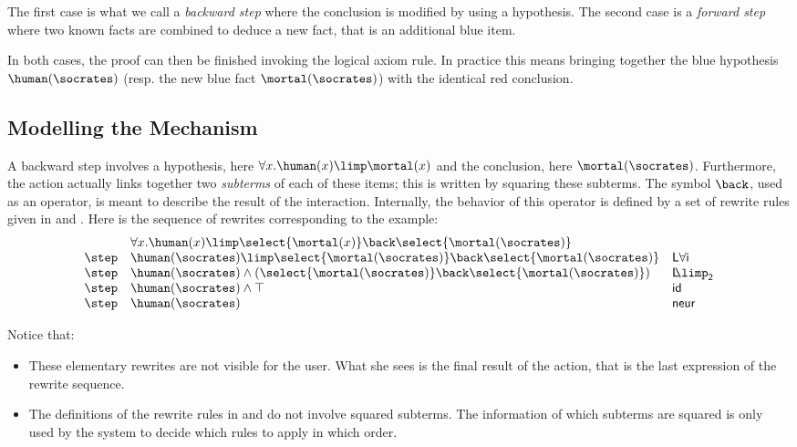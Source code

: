 The first case is what we call a {\em backward step} where the conclusion is
modified by using a hypothesis. The second case is a {\em forward step} where
two known facts are combined to deduce a new fact, that is an additional blue
item.

In both cases, the proof can then be finished invoking the logical
axiom rule. In practice this means bringing together the blue
hypothesis $\human(\socrates)$ (resp. the new blue fact
$\mortal(\socrates)$) with the identical red conclusion.


\subsection{Modelling the Mechanism}

A backward step involves a hypothesis, here $\forall x.\-\human(x)
\allowbreak\limp \mortal(x)$ and the conclusion, here $\mortal(\socrates)$.
Furthermore, the action actually links together two {\em subterms} of each of
these items; this is written by squaring these subterms. The symbol ${\back}$,
used as an operator, is meant to describe the result of the interaction.
Internally, the behavior of this operator is defined by a set of rewrite rules
given in  and . Here is the sequence of
rewrites corresponding to the example: \renewcommand{\arraystretch}{1.1}
$$\begin{array}{lll}
    &  \forall x.\human(x)\limp \select{\mortal(x)} \back \select{\mortal(\socrates)}&\\
    \step &
           \human(\socrates)\limp \select{\mortal(\socrates)}
           \back \select{\mortal(\socrates)}&
                                               \mathsf{L\forall i}\\
    \step &
           \human(\socrates)\land(\select{\mortal(\socrates)}
           \back \select{\mortal(\socrates)}) &
                                                 \mathsf{L\!\!\limp_2}\\
    \step &  \human(\socrates)\land \top &
                                           \mathsf{id}\\
    \step & \human(\socrates)&\mathsf{neur}\\
  \end{array}$$

Notice that:
\begin{itemize}
\item   These elementary rewrites are not visible for the user. What she sees is
  the final result of the action, that is the last expression of the rewrite
  sequence.
\item The definitions of the rewrite rules in  and
   do not involve squared subterms. The information of which
  subterms are squared is only used by the system to decide which rules to
  apply in which order.
\end{itemize}

